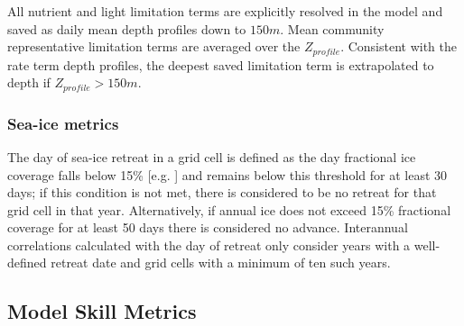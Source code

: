 
All nutrient and light limitation terms are explicitly resolved in the model and saved as daily mean depth profiles down to $150m$. Mean community representative limitation terms are averaged over the $Z_{profile}$. Consistent with the rate term depth profiles, the deepest saved limitation term is extrapolated to depth if $Z_{profile}>150m$. 

\subsubsection{Sea-ice metrics}

The day of sea-ice retreat in a grid cell is defined as the day fractional ice coverage falls below 15\% [e.g. \parencite{StammerjohnTrendsAntarcticannual2008}] and remains below this threshold for at least 30 days; if this condition is not met, there is considered to be no retreat for that grid cell in that year. Alternatively, if annual ice does not exceed 15\% fractional coverage for at least 50 days there is considered no advance. Interannual correlations calculated with the day of retreat only consider years with a well-defined retreat date and grid cells with a minimum of ten such years.  

\subsection{Model Skill Metrics}

